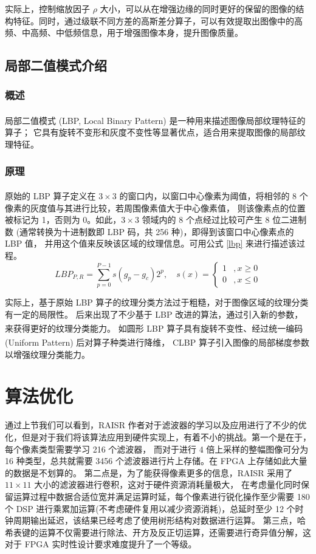 \documentclass[12pt, a4paper, oneside]{ctexbook}
\begin{document}
	实际上，控制缩放因子 $\rho$ 大小，可以从在增强边缘的同时更好的保留的图像的结构特征。同时，通过级联不同方差的高斯差分算子，可以有效提取出图像中的高频、中高频、中低频信息，用于增强图像本身，提升图像质量。

	\subsection{局部二值模式介绍}
	\subsubsection{概述}
	局部二值模式 (LBP, Local Binary Pattern)\textsuperscript{\cite{8}}\textsuperscript{\cite{9}}\textsuperscript{\cite{13}} 是一种用来描述图像局部纹理特征的算子；
	它具有旋转不变形和灰度不变性等显著优点，适合用来提取图像的局部纹理特征。	
	\subsubsection{原理}
	原始的 LBP 算子\textsuperscript{\cite{13}}定义在 $3\times3$ 的窗口内，以窗口中心像素为阈值，将相邻的 8 个像素的灰度值与其进行比较，若周围像素值大于中心像素值，
	则该像素点的位置被标记为 1，否则为 0。如此，$3\times3$ 领域内的 8 个点经过比较可产生 8 位二进制数 (通常转换为十进制数即 LBP 码，共 256 种)，即得到该窗口中心像素点的 LBP 值，
	并用这个值来反映该区域的纹理信息。可用公式 \ref{lbp} 来进行描述该过程。
	\begin{equation}
		LBP_{P,R}=\sum_{p=0}^{P-1}s(g_p-g_c)2^{p},\quad s(x)=\begin{cases}
			1  &,x\geq0\\
			0  &,x\le0 
		\end{cases}
		\label{lbp}
	\end{equation}
	\par
	实际上，基于原始 LBP 算子的纹理分类方法过于粗糙，对于图像区域的纹理分类有一定的局限性。
	后来出现了不少基于 LBP 改进的算法，通过引入新的参数，来获得更好的纹理分类能力。
	如圆形 LBP 算子\textsuperscript{\cite{8}}具有旋转不变性、经过统一编码 (Uniform Pattern) 后对算子种类进行降维，
	CLBP 算子\textsuperscript{\cite{9}}引入图像的局部梯度参数以增强纹理分类能力。

	\section{算法优化}
	通过上节我们可以看到，RAISR 作者对于滤波器的学习以及应用进行了不少的优化，但是对于我们将该算法应用到硬件实现上，有着不小的挑战。第一个是在于，每个像素类型需要学习 216 个滤波器，
	而对于进行 4 倍上采样的整幅图像可分为 16 种类型，总共就需要 3456 个滤波器进行片上存储。在 FPGA 上存储如此大量的数据是不划算的。
	第二点是，为了能获得像素更多的信息，RAISR 采用了 $11\times11$ 大小的滤波器进行卷积，这对于硬件资源消耗量极大，
	在考虑量化同时保留运算过程中数据合适位宽并满足运算时延，每个像素进行锐化操作至少需要 180 个 DSP 进行乘累加运算(不考虑硬件复用以减少资源消耗)，总延时至少 12 个时钟周期输出延迟，该结果已经考虑了使用树形结构对数据进行运算。
	第三点，哈希表键的运算不仅需要进行除法、开方及反正切运算，还需要进行奇异值分解，这对于 FPGA 实时性设计要求难度提升了一个等级。
\end{document}
